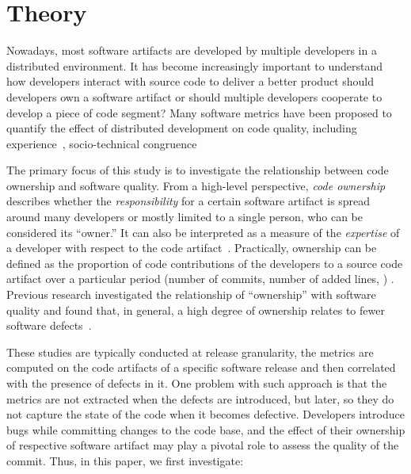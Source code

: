
\section{Theory}
\label{sec:prob}

Nowadays, most software artifacts are developed by multiple developers in a
distributed environment. It has become increasingly important to understand how
developers interact with source code to deliver a better product\textemdash
should developers own a software artifact or should multiple developers
cooperate to develop a piece of code segment? Many software metrics have been
proposed to quantify the effect of distributed development on code quality,
including experience~\cite{Rahman:blame}, socio-technical
congruence~\cite{sarma09ICSE} \etc 

The primary focus of this study is to investigate the relationship between code
ownership and software quality. From a high-level perspective, \emph{code
ownership} describes whether the \textit{responsibility} for a certain software
artifact is spread around many developers or mostly limited to a single person,
who can be considered its ``owner.'' It can also be interpreted as a measure of
the \textit{expertise} of a developer with respect to the code
artifact~\cite{bird:original}.
%
Practically, ownership can be defined as
the proportion of code contributions of the developers to a source code artifact over a particular
period (\eg number of commits, number of added lines,
\etc) \cite{Greiler:replication}.
Previous research investigated the relationship of ``ownership'' with software
quality and found that, in general, a high degree of ownership relates to fewer
software defects~\cite{bird:original}.


These studies are typically
conducted at release granularity, 
\ie the metrics are computed on the code artifacts of a specific software
release and then correlated with the presence of defects in it. 
One problem with such approach is that the metrics are not extracted when the
defects are introduced, but later, so they do not capture the state of the code
when it becomes defective. Developers introduce bugs while committing changes
to the code base, and the effect of their ownership of respective software
artifact may play a pivotal role to assess the quality of the commit.  Thus, in
this paper, we first investigate:


